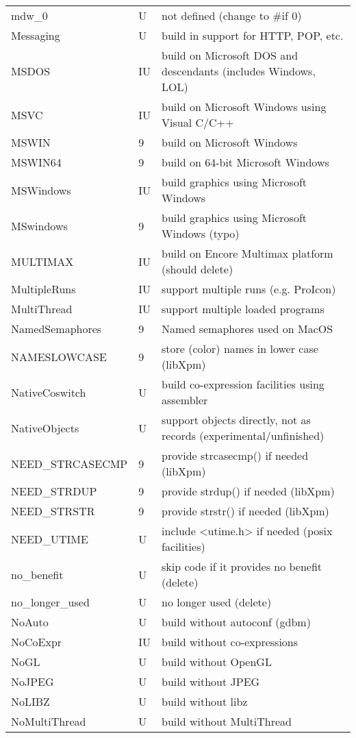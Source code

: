 \begin{xtabular}{|m{1.8in}|m{0.5in}|m{4.0in}|}
mdw\_0 & U & not defined (change to \#if 0) \\
Messaging & U & build in support for HTTP, POP, etc. \\
MSDOS & IU & build on Microsoft DOS and descendants (includes Windows, LOL) \\
MSVC & IU & build on Microsoft Windows using Visual C/C++ \\
MSWIN & 9 & build on Microsoft Windows \\
MSWIN64 & 9 & build on 64-bit Microsoft Windows \\
MSWindows & IU & build graphics using Microsoft Windows \\
MSwindows & 9 & build graphics using Microsoft Windows (typo) \\
MULTIMAX & IU & build on Encore Multimax platform (should delete) \\
MultipleRuns & IU & support multiple runs (e.g. ProIcon) \\
MultiThread & IU & support multiple loaded programs \\
NamedSemaphores & 9 & Named semaphores used on MacOS \\
NAMESLOWCASE & 9 & store (color) names in lower case (libXpm) \\
NativeCoswitch & U & build co-expression facilities using assembler \\
NativeObjects & U & support objects directly, not as records (experimental/unfinished) \\
NEED\_STRCASECMP & 9 & provide strcasecmp() if needed (libXpm) \\
NEED\_STRDUP & 9 & provide strdup() if needed (libXpm) \\
NEED\_STRSTR & 9 & provide strstr() if needed (libXpm) \\
NEED\_UTIME & U & include <utime.h> if needed (posix facilities) \\
no\_benefit & U & skip code if it provides no benefit (delete) \\
no\_longer\_used & U & no longer used (delete) \\
NoAuto & U & build without autoconf (gdbm) \\
NoCoExpr & IU & build without co-expressions \\
NoGL & U & build without OpenGL \\
NoJPEG & U & build without JPEG \\
NoLIBZ & U & build without libz \\
NoMultiThread & U & build without MultiThread \\

\end{xtabular}
